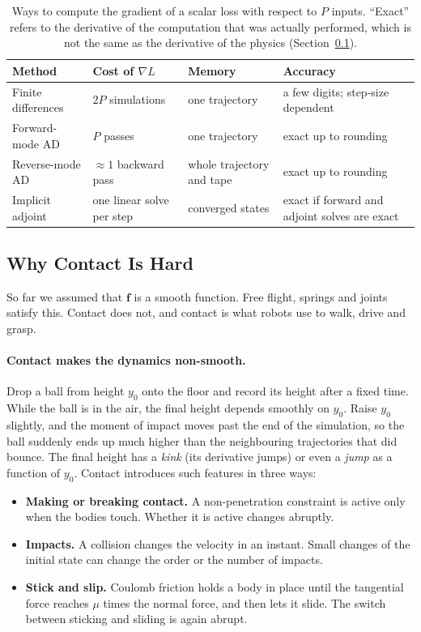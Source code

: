 \begin{table}[h]
  \centering
  \small
  \begin{tabular}{@{}p{3.2cm}p{3.4cm}p{3.0cm}p{4.6cm}@{}}
    \toprule
    Method & Cost of $\nabla L$ & Memory & Accuracy \\
    \midrule
    Finite differences & $2P$ simulations & one trajectory & a few digits; step-size dependent \\
    Forward-mode AD & $P$ passes & one trajectory & exact up to rounding \\
    Reverse-mode AD & $\approx 1$ backward pass & whole trajectory and tape & exact up to rounding \\
    Implicit adjoint & one linear solve per step & converged states & exact if forward and adjoint solves are exact \\
    \bottomrule
  \end{tabular}
  \caption{Ways to compute the gradient of a scalar loss with respect to
    $P$ inputs. ``Exact'' refers to the derivative of the computation that
    was actually performed, which is not the same as the derivative of the
    physics (Section~\ref{sec:diffsim-contact}).}
  \label{tab:diffsim-methods}
\end{table}

\subsection{Why Contact Is Hard}
\label{sec:diffsim-contact}

So far we assumed that $\mathbf{f}$ is a smooth function. Free flight,
springs and joints satisfy this. Contact does not, and contact is what
robots use to walk, drive and grasp.

\paragraph{Contact makes the dynamics non-smooth.}
Drop a ball from height $y_0$ onto the floor and record its height after a
fixed time. While the ball is in the air, the final height depends
smoothly on $y_0$. Raise $y_0$ slightly, and the moment of impact moves
past the end of the simulation, so the ball suddenly ends up much higher
than the neighbouring trajectories that did bounce. The final height has a
\emph{kink} (its derivative jumps) or even a \emph{jump} as a function of
$y_0$. Contact introduces such features in three ways:
\begin{itemize}
  \item \textbf{Making or breaking contact.} A non-penetration constraint
    is active only when the bodies touch. Whether it is active changes
    abruptly.
  \item \textbf{Impacts.} A collision changes the velocity in an instant.
    Small changes of the initial state can change the order or the number
    of impacts.
  \item \textbf{Stick and slip.} Coulomb friction holds a body in place
    until the tangential force reaches $\mu$ times the normal force, and
    then lets it slide. The switch between sticking and sliding is again
    abrupt.
\end{itemize}

